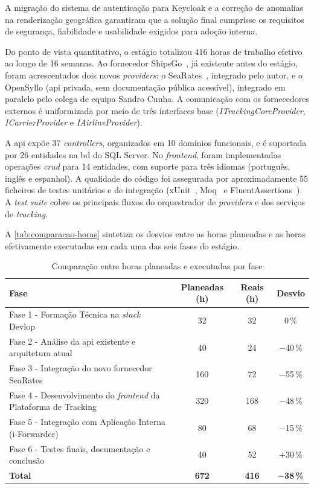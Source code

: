 A migração do sistema de autenticação para Keycloak e a correção de anomalias na renderização geográfica garantiram que a solução final cumprisse os requisitos de segurança, fiabilidade e usabilidade exigidos para adoção interna.

Do ponto de vista quantitativo, o estágio totalizou 416 horas de trabalho efetivo ao longo de 16 semanas. Ao fornecedor ShipsGo~\cite{shipsgo}, já existente antes do estágio, foram acrescentados dois novos \textit{providers}: o SeaRates~\cite{searates}, integrado pelo autor, e o OpenSyllo (\gls{api} privada, sem documentação pública acessível), integrado em paralelo pelo colega de equipa Sandro Cunha. A comunicação com os fornecedores externos é uniformizada por meio de três interfaces base (\textit{ITrackingCoreProvider}, \textit{ICarrierProvider} e \textit{IAirlineProvider}).

A \gls{api} expõe 37 \textit{controllers}, organizados em 10 domínios funcionais, e é suportada por 26 entidades na \gls{bd} do SQL Server. No \textit{frontend}, foram implementadas operações \textit{\gls{crud}} para 14 entidades, com suporte para três idiomas (português, inglês e espanhol). A qualidade do código foi assegurada por aproximadamente 55 ficheiros de testes unitários e de integração (xUnit~\cite{xunit}, Moq~\cite{moq} e FluentAssertions~\cite{fluentassertions}). A \textit{test suite} cobre os principais fluxos do orquestrador de \textit{providers} e dos serviços de \textit{tracking}.

A \autoref{tab:comparacao-horas} sintetiza os desvios entre as horas planeadas e as horas efetivamente executadas em cada uma das seis fases do estágio.

\begin{table}[H]
\centering
\caption{Comparação entre horas planeadas e executadas por fase}
\label{tab:comparacao-horas}
\small
\begin{tabular}{|p{}|c|c|c|}
\hline
\textbf{Fase} & \textbf{Planeadas (h)} & \textbf{Reais (h)} & \textbf{Desvio} \\
\hline
Fase 1 - Formação Técnica na \textit{stack} Devlop & 32 & 32 & 0\,\% \\
\hline
Fase 2 - Análise da \gls{api} existente e arquitetura atual & 40 & 24 & $-$40\,\% \\
\hline
Fase 3 - Integração do novo fornecedor SeaRates & 160 & 72 & $-$55\,\% \\
\hline
Fase 4 - Desenvolvimento do \textit{frontend} da Plataforma de Tracking & 320 & 168 & $-$48\,\% \\
\hline
Fase 5 - Integração com Aplicação Interna (i-Forwarder) & 80 & 68 & $-$15\,\% \\
\hline
Fase 6 - Testes finais, documentação e conclusão & 40 & 52 & +30\,\% \\
\hline
\textbf{Total} & \textbf{672} & \textbf{416} & \textbf{$-$38\,\%} \\
\hline
\end{tabular}
\end{table}

